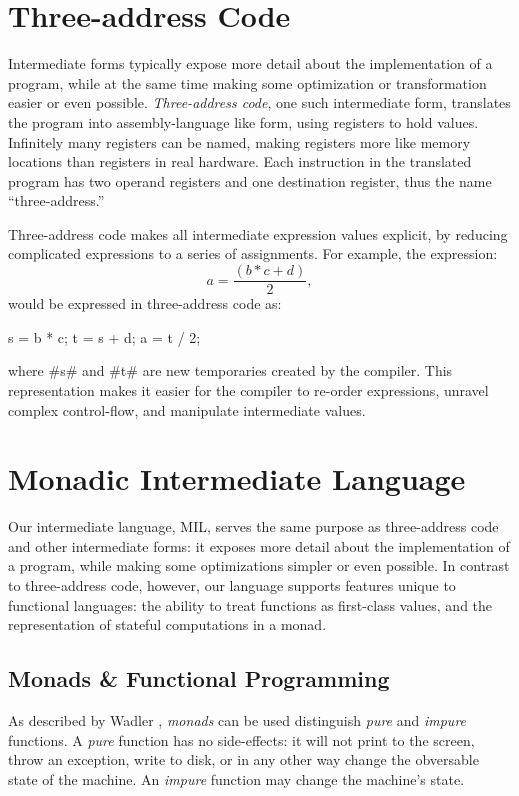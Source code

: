 \documentclass[12pt]{report}
\begin{document}
\section{Three-address Code}

Intermediate forms typically expose more detail about the
implementation of a program, while at the same time making some
optimization or transformation easier or even possible. 
\emph{Three-address code}, one such intermediate form, translates the
program into assembly-language like form, using registers to
hold values. Infinitely many registers can be named, making registers
more like memory locations than registers in real hardware. Each
instruction in the translated program has two operand registers and one
destination register, thus the name ``three-address.'' 

Three-address code makes all intermediate expression values explicit, 
by reducing complicated expressions to a series of assignments. 
For example, the expression:
\begin{equation}
  a = \frac{(b * c + d)}{2},
\end{equation}
would be expressed in three-address code as:
\begin{AVerb}
  s = b * c;
  t = s + d;
  a = t / 2;
\end{AVerb}
where #s# and #t# are new temporaries created by the compiler. This 
representation makes it easier for the compiler to re-order expressions,
unravel complex control-flow, and manipulate intermediate values. 

\section{Monadic Intermediate Language}

Our intermediate language, MIL, serves the same purpose as
three-address code and other intermediate forms: it exposes more
detail about the implementation of a program, while making some
optimizations simpler or even possible. In contrast to three-address
code, however, our language supports features unique to functional
languages: the ability to treat functions as first-class values, and
the representation of stateful computations in a monad.

\subsection{Monads \& Functional Programming}
As described by Wadler \citep{Wadler1990}, \emph{monads} can be used
distinguish \emph{pure} and \emph{impure} functions. A \emph{pure}
function has no side-effects: it will not print to the screen, throw
an exception, write to disk, or in any other way change the obversable
state of the machine. An \emph{impure} function may change the
machine's state.
\end{document}
